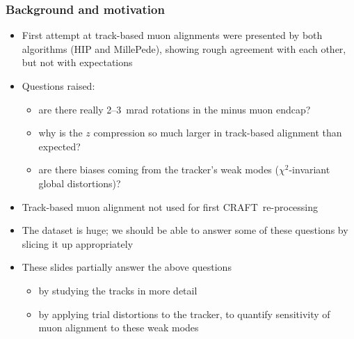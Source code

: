 \documentclass[compress]{beamer}
\begin{document}
\begin{frame}
\frametitle{Background and motivation}
\begin{itemize}\setlength{\itemsep}{0.1 cm}
\item First attempt at track-based muon alignments were presented by both
  algorithms (HIP and MillePede), showing rough agreement with each
  other, but not with expectations
\item Questions raised:
\begin{itemize}
\item are there really 2--3~mrad rotations in the minus muon endcap?
\item why is the $z$ compression so much larger in track-based alignment than expected?
\item are there biases coming from the tracker's weak modes
  ($\chi^2$-invariant global distortions)?
\end{itemize}

\item Track-based muon alignment not used for first \mbox{CRAFT re-processing\hspace{-1 cm}}

\item The dataset is huge; we should be able to answer some of these
  questions by slicing it up appropriately

\item These slides partially answer the above questions
\begin{itemize}
\item by studying the tracks in more detail
\item by applying trial distortions to the tracker, to quantify
  sensitivity of muon alignment to these weak modes
\end{itemize}
\end{itemize}
\end{frame}
\end{document}
